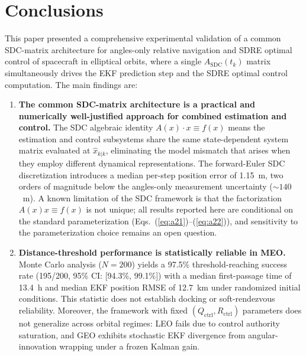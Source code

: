 \documentclass[preprint,3p,times]{elsarticle}
\begin{document}
\section{Conclusions}

This paper presented a comprehensive experimental validation of a common SDC-matrix architecture for angles-only relative navigation and SDRE optimal control of spacecraft in elliptical orbits, where a single $A_{\text{SDC}}(t_k)$ matrix simultaneously drives the EKF prediction step and the SDRE optimal control computation. The main findings are:

\begin{enumerate}
    \item \textbf{The common SDC-matrix architecture is a practical and numerically well-justified approach for combined estimation and control.} The SDC algebraic identity $A(x) \cdot x \equiv f(x)$ means the estimation and control subsystems share the same state-dependent system matrix evaluated at $\hat{x}_{k|k}$, eliminating the model mismatch that arises when they employ different dynamical representations. The forward-Euler SDC discretization introduces a median per-step position error of 1.15~m, two orders of magnitude below the angles-only measurement uncertainty (${\sim}140$~m). A known limitation of the SDC framework is that the factorization $A(x)x \equiv f(x)$ is not unique; all results reported here are conditional on the standard parameterization (Eqs.~(\ref{eq:a21})--(\ref{eq:a22})), and sensitivity to the parameterization choice remains an open question.

    \item \textbf{Distance-threshold performance is statistically reliable in MEO.} Monte Carlo analysis ($N = 200$) yields a 97.5\% threshold-reaching success rate (195/200, 95\% CI: [94.3\%, 99.1\%]) with a median first-passage time of 13.4~h and median EKF position RMSE of 12.7~km under randomized initial conditions. This statistic does not establish docking or soft-rendezvous reliability. Moreover, the framework with fixed $(Q_{\text{ctrl}}, R_{\text{ctrl}})$ parameters does not generalize across orbital regimes: LEO fails due to control authority saturation, and GEO exhibits stochastic EKF divergence from angular-innovation wrapping under a frozen Kalman gain.


\end{enumerate}
\end{document}
